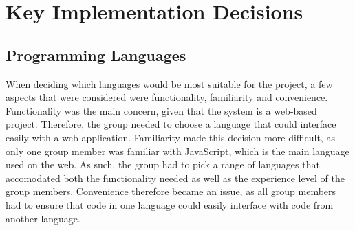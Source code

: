 \documentclass[a4paper,titlepage]{article}
\begin{document}
\section{Key Implementation Decisions}
\subsection{Programming Languages}
When deciding which languages would be most suitable for the project, a few aspects that were considered were functionality, familiarity  and convenience. 
Functionality was the main concern, given that the system is a web-based project. 
Therefore, the group needed to choose a language that could interface easily with a web application. 
Familiarity made this decision more difficult, as only one group member was familiar with JavaScript, which is the main language used on the web. 
As such, the group had to pick a range of languages that accomodated both the functionality needed as well as the experience level of the group members. 
Convenience therefore became an issue, as all group members had to ensure that code in one language could easily interface with code from another language.
\end{document}
